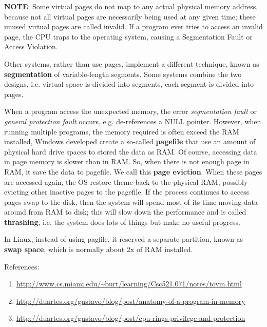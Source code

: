 {\bf NOTE}: Some virtual pages do not map to any actual physical
memory address, because not all virtual pages are necessarily being
used at any given time; these unused virtual pages are called
invalid. If a program ever tries to access an invalid page, the CPU
traps to the operating system, causing a Segmentation Fault or Access
Violation.

Other systems, rather than use pages, implement a different technique,
known as {\bf segmentation} of variable-length segments. Some systems
combine the two designs, i.e. virtual space is divided into segments,
each segment is divided into pages.

When a program access the unexpected memory, the error
{\it segmentation fault} or {\it general protection fault} occurs,
e.g. de-references a NULL pointer.  However, when running multiple
programs, the memory required is often exceed the RAM installed,
Windows developed create a so-called {\bf pagefile} that use an amount
of physical hard drive spaces to stored the data as RAM. Of course,
accessing data in page memory is slower than in RAM. So, when there is
not enough page in RAM, it save the data to pagefile. We call this
{\bf page eviction}. When these pages are accessed again, the OS
restore theme back to the physical RAM, possibly evicting other
inactive pages to the pagefile. If the process continues to access
pages swap to the disk, then the system will spend most of its time
moving data around from RAM to disk; this will slow down the
performance and is called {\bf thrashing}, i.e. the system does lots
of things but make no useful progress. 


In Linux, instead of using pagfile, it reserved a separate partition,
known as {\bf swap space}, which is normally about 2x of RAM
installed.

References:
\begin{enumerate}
\item
  \url{http://www.cs.miami.edu/~burt/learning/Csc521.071/notes/tovm.html}
\item
  \url{http://duartes.org/gustavo/blog/post/anatomy-of-a-program-in-memory}
\item \url{http://duartes.org/gustavo/blog/post/cpu-rings-privilege-and-protection}
\end{enumerate}

% 



